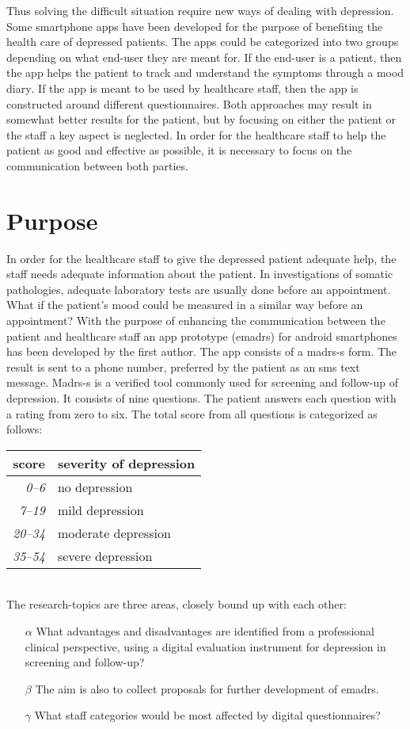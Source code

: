 \documentclass[12pt,a4paper,oneside]{article}
\let\oldcite\cite
\renewcommand*\cite[1]{\textsuperscript{\oldcite{#1}}}
\begin{document}
Thus solving the difficult situation require new ways of dealing with depression. Some smartphone apps have been developed for the purpose of benefiting the health care of depressed patients. The apps could be categorized into two groups depending on what end-user they are meant for. If the end-user is a patient, then the app helps the patient to track and understand the symptoms through a mood diary\cite{app1}. If the app is meant to be used by healthcare staff, then the app is constructed around different questionnaires\cite{app2}. Both approaches may result in somewhat better results for the patient, but by focusing on either the patient or the staff a key aspect is neglected. In order for the healthcare staff to help the patient as good and effective as possible, it is necessary to focus on the communication between both parties.

\section*{Purpose}
In order for the healthcare staff to give the depressed patient adequate help, the staff needs adequate information about the patient. In investigations of somatic pathologies, adequate laboratory tests are usually done before an appointment. What if the patient's mood could be measured in a similar way before an appointment? With the purpose of enhancing the communication between the patient and healthcare staff an app prototype (e{\sc madrs}) for android smartphones has been developed by the first author\cite{emadrs1, emadrs2}. The app consists of a {\sc madrs-s} form. The result is sent to a phone number, preferred by the patient as an {\sc sms} text message. {\sc Madrs-s} is a verified tool commonly used for screening and follow-up of depression\cite{madrs2,madrs3}. It consists of nine questions. The patient answers each question with a rating from zero to six. The total score from all questions is categorized as follows:\\

\begin{tabular}{r|l}
{\bf score} & {\bf severity of depression}\\
\hline{\it 0--6} &  no depression\\
{\it 7--19} & mild depression\\
{\it 20--34} & moderate depression\\
{\it 35--54} & severe depression\\
\end{tabular}\vspace{1em}
\\The research-topics are three areas, closely bound up with each other:
\begin{itemize}
\item[$\alpha$] What advantages and disadvantages are identified from a professional clinical perspective, using a digital evaluation instrument for depression in screening and follow-up?
\item[$\beta$] The aim is also to collect proposals for further development of e{\sc madrs}.
\item[$\gamma$] What staff categories would be most affected by digital questionnaires?
\end{itemize}
\end{document}
